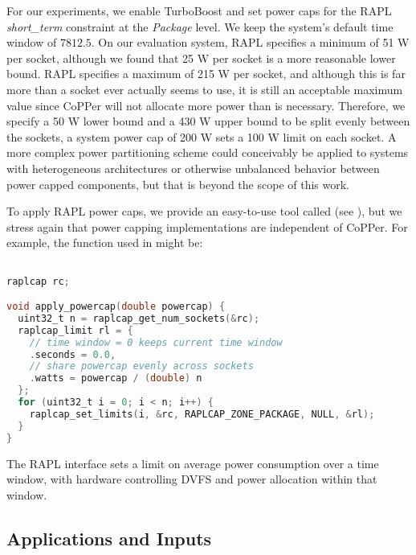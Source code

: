 For our experiments, we enable TurboBoost and set power caps for the RAPL \emph{short\_term} constraint at the \emph{Package} level.
We keep the system's default time window of $7812.5$\us. %
On our evaluation system, RAPL specifies a minimum of 51 W per socket, although we found that 25 W per socket is a more reasonable lower bound.
RAPL specifies a maximum of 215 W per socket, and although this is far more than a socket ever actually seems to use, it is still an acceptable maximum value since CoPPer will not allocate more power than is necessary.
Therefore, we specify a 50 W lower bound and a 430 W upper bound to be split evenly between the sockets, \eg a system power cap of 200 W sets a 100 W limit on each socket.
A more complex power partitioning scheme could conceivably be applied to systems with heterogeneous architectures or otherwise unbalanced behavior between power capped components, but that is beyond the scope of this work.

To apply RAPL power caps, we provide an easy-to-use tool called  (see ), but we stress again that power capping implementations are independent of CoPPer.
For example, the  function used in  might be:
%
\begin{lstlisting}[language=C,%
  caption={Applying a power cap with RAPLCap.},%
  morekeywords={uint32_t, raplcap, raplcap_limit},%
  label={lst:example-powercap}]%

raplcap rc;

void apply_powercap(double powercap) {
  uint32_t n = raplcap_get_num_sockets(&rc);
  raplcap_limit rl = {
    // time window = 0 keeps current time window
    .seconds = 0.0,
    // share powercap evenly across sockets
    .watts = powercap / (double) n
  };
  for (uint32_t i = 0; i < n; i++) {
    raplcap_set_limits(i, &rc, RAPLCAP_ZONE_PACKAGE, NULL, &rl);
  }
}
\end{lstlisting}
The RAPL interface sets a limit on average power consumption over a time window, with hardware controlling DVFS and power allocation within that window.


\subsection{Applications and Inputs}
\label{sec:copper-inputs}

